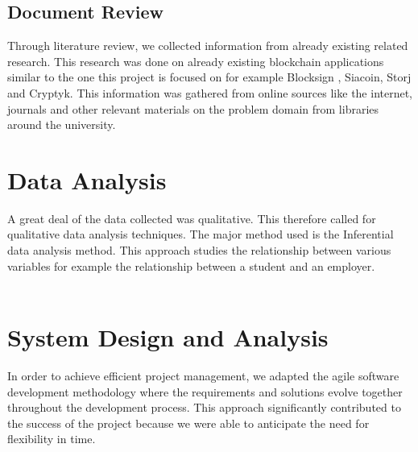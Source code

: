 \subsection{Document Review}
Through literature review, we collected information from already existing related research. This research was done on already existing blockchain applications similar to the one this project is focused on for example Blocksign \cite{art14}, Siacoin\cite{art15}, Storj\cite{art16} and Cryptyk\cite{art18}. This information was gathered from online sources like the internet, journals and other relevant materials on the problem domain from libraries around the university.


\section{Data Analysis}
A great deal of the data collected was qualitative. This therefore called for qualitative data analysis techniques. The major method used is the Inferential data analysis method. This approach studies the relationship between various variables for example the relationship between a student and an employer.\\~\\

\section{System Design and Analysis}
In order to achieve efficient project management, we adapted the agile software development methodology where the requirements and solutions evolve together throughout the development process. This approach significantly contributed to the success of the project because we were able to anticipate the need for flexibility in time. 

